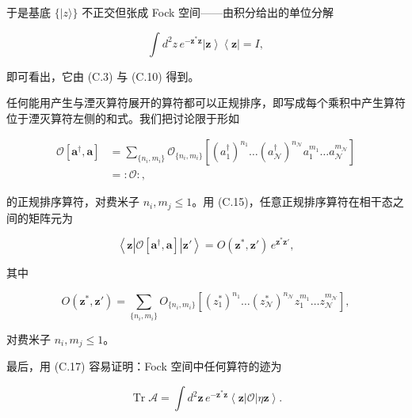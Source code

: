于是基底 $\{|z\rangle\}$ 不正交但张成 Fock 空间——由积分给出的单位分解

\begin{equation*}
\int d ^ {2} z \, e ^ {- \mathbf {z} ^ {*} \mathbf {z}} \left| \mathbf {z} \right\rangle \left\langle \mathbf {z} \right| = I ,
\tag{C.17}
\end{equation*}

即可看出，它由 (C.3) 与 (C.10) 得到。

任何能用产生与湮灭算符展开的算符都可以正规排序，即写成每个乘积中产生算符位于湮灭算符左侧的和式。我们把讨论限于形如

\begin{align*}
\mathcal {O} [ \mathbf {a} ^ {\dagger}, \mathbf {a} ] & = \sum_{\{n _ {i}, m _ {i} \}} \mathcal {O}_{\{n _ {i}, m _ {i} \}} \left[ \left( a _ {1} ^ {\dagger} \right) ^ {n _ {1}} \dots \left( a _ {\mathcal {N}} ^ {\dagger} \right) ^ {n _ {\mathcal {N}}} a _ {1} ^ {m _ {1}} \dots a _ {\mathcal {N}} ^ {m _ {\mathcal {N}}} \right]\\
& = : \mathcal {O} : ,
\tag{C.18}
\end{align*}

的正规排序算符，对费米子 $n_{i}, m_{j} \leq 1$。用 (C.15)，任意正规排序算符在相干态之间的矩阵元为

\begin{equation*}
\left\langle \mathbf {z} \left| \mathcal {O} [ \mathbf {a} ^ {\dagger}, \mathbf {a} ] \right| \mathbf {z} ' \right\rangle = O ( \mathbf {z} ^ {*}, \mathbf {z} ' ) \, e ^ {\mathbf {z} ^ {*} \mathbf {z} '} ,
\tag{C.19}
\end{equation*}

其中

\begin{equation*}
O \left( \mathbf {z} ^ {*}, \mathbf {z} ' \right) = \sum_{\{n _ {i}, m _ {i} \}} O_{\{n _ {i}, m _ {i} \}} \left[ \left( z _ {1} ^ {*} \right) ^ {n _ {1}} \dots \left( z _ {\mathcal {N}} ^ {*} \right) ^ {n _ {\mathcal {N}}} z _ {1} ^ {m _ {1}} \dots z _ {\mathcal {N}} ^ {m _ {\mathcal {N}}} \right] ,
\tag{C.20}
\end{equation*}

对费米子 $n_i, m_j \leq 1$。

最后，用 (C.17) 容易证明：Fock 空间中任何算符的迹为

\begin{equation*}
\operatorname{Tr} \mathcal {A} = \int d ^ {2} \mathbf {z} \, e ^ {- \mathbf {z} ^ {*} \mathbf {z}} \left\langle \mathbf {z} \left| \mathcal {O} \right| \eta \mathbf {z} \right\rangle .
\tag{C.21}
\end{equation*}

